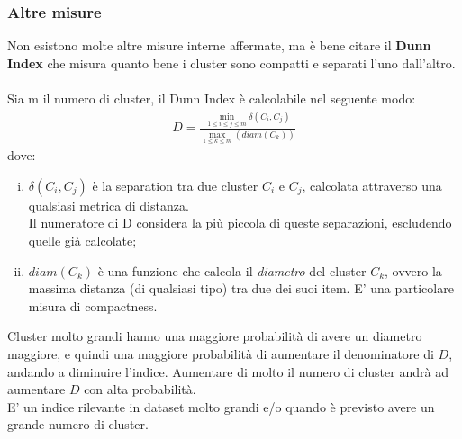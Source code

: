 \subsubsection{Altre misure}
Non esistono molte altre misure interne affermate, ma è bene citare il \textbf{Dunn Index} che misura quanto bene i cluster sono compatti e separati l'uno dall'altro.\\
\\
Sia m il numero di cluster, il Dunn Index è calcolabile nel seguente modo:
\begin{align}
D = \frac{\min_{1\le i \le j \le m}\delta(C_i, C_j)}{\max_{1 \le k \le m}(diam(C_k))}
\end{align}
dove:
\begin{enumerate}[(i)]
	\item $ \delta(C_i, C_j) $ è la separation tra due cluster $C_i$ e $C_j$, calcolata attraverso una qualsiasi metrica di distanza.\\
	Il numeratore di D considera la più piccola di queste separazioni, escludendo quelle già calcolate;
	\item $ diam(C_k) $ è una funzione che calcola il \textit{diametro} del cluster $C_k$, ovvero la massima distanza (di qualsiasi tipo) tra due dei suoi item. E' una particolare misura di compactness.
\end{enumerate}
Cluster molto grandi hanno una maggiore probabilità di avere un diametro maggiore, e quindi una maggiore probabilità di aumentare il denominatore di $D$, andando a diminuire l'indice. Aumentare di molto il numero di cluster andrà ad aumentare $D$ con alta probabilità.\\
E' un indice rilevante in dataset molto grandi e/o quando è previsto avere un grande numero di cluster.

